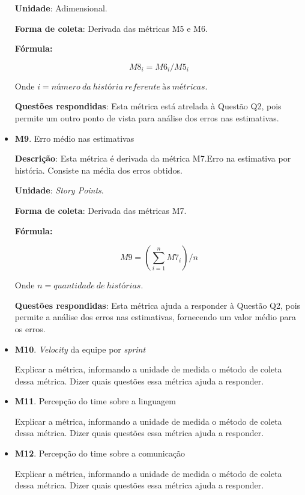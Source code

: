 \begin{itemize}
	   \subitem \textbf{Unidade}: Adimensional.
	   
	   \subitem \textbf{Forma de coleta}: Derivada das métricas M5 e M6.
	   
	      \subsubitem \textbf{Fórmula:} 
	      
		$$ M8_i = M6_i / M5_i $$
		
	      \subsubitem Onde $i = número\ da\ história\ referente\ às\ métricas$.
	   
	   \subitem \textbf{Questões respondidas}: Esta métrica está atrelada à Questão Q2, pois permite um outro ponto de vista
		    para análise dos erros nas estimativas.
	 
	 \item \textbf{M9}. Erro médio nas estimativas
	   
	   \subitem \textbf{Descrição}: Esta métrica é derivada da métrica M7.Erro na estimativa por história.
		    Consiste na média dos erros obtidos.
	   
	   \subitem \textbf{Unidade}: \textit{Story Points}.
	   
	   \subitem \textbf{Forma de coleta}: Derivada das métricas M7.
	   
	      \subsubitem \textbf{Fórmula:} 
	      
		$$ M9 = (\sum\limits_{i=1}^{n}M7_i)/n $$
		
	      \subsubitem Onde $n = quantidade\ de\ histórias$.
	   
	   \subitem \textbf{Questões respondidas}: Esta métrica ajuda a responder à Questão Q2, pois permite a análise 
		    dos erros nas estimativas, fornecendo um valor médio para os erros.
		    
	 \item \textbf{M10}. \textit{Velocity} da equipe por \textit{sprint}
	 
	   \subitem Explicar a métrica, informando a unidade de medida o método de coleta dessa métrica. Dizer quais questões essa
		    métrica ajuda a responder.
	 
	 \item \textbf{M11}. Percepção do time sobre a linguagem
	 
	   \subitem Explicar a métrica, informando a unidade de medida o método de coleta dessa métrica. Dizer quais questões essa
		    métrica ajuda a responder.
	
	 \item \textbf{M12}. Percepção do time sobre a comunicação
	 
	   \subitem Explicar a métrica, informando a unidade de medida o método de coleta dessa métrica. Dizer quais questões essa
		    métrica ajuda a responder.
		    
	\end{itemize}
	
